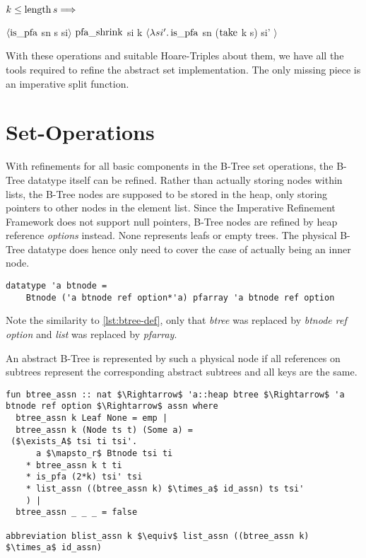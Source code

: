 \begin{lemma}
    $k \le \operatorname{length} s\Longrightarrow$ \\
    \begin{center}
    $\langle \operatorname{is\_pfa}$ sn s si$\rangle$
    $\operatorname{pfa\_shrink}$ si k
    $\langle\lambda si'. \operatorname{is\_pfa}$ sn ($\operatorname{take}$ k s) si' $\rangle$
    \end{center}
\end{lemma}

With these operations and suitable Hoare-Triples about them,
we have all the tools required to refine the abstract set implementation.
The only missing piece is an imperative split function.

\section{Set-Operations}

With refinements for all basic components in the B-Tree set operations,
the B-Tree datatype itself can be refined.
Rather than actually storing nodes within lists,
the B-Tree nodes are supposed to be stored in the heap,
only storing pointers to other nodes in the element list.
Since the Imperative Refinement Framework does not support null pointers,
B-Tree nodes are refined by heap reference \textit{options} instead.
None represents leafs or empty trees.
The physical B-Tree datatype does hence only need to cover the case
of actually being an inner node.

\begin{lstlisting}[mathescape=true, language=Isabelle]
datatype 'a btnode =
    Btnode ('a btnode ref option*'a) pfarray 'a btnode ref option
\end{lstlisting}

Note the similarity to \autoref{lst:btree-def},
only that \textit{btree} was replaced by \textit{btnode ref option}
and \textit{list} was replaced by \textit{pfarray}.

An abstract B-Tree is represented by such a physical node
if all references on subtrees represent the corresponding
abstract subtrees and all keys are the same.

\begin{lstlisting}[mathescape=true, language=Isabelle]
fun btree_assn :: nat $\Rightarrow$ 'a::heap btree $\Rightarrow$ 'a btnode ref option $\Rightarrow$ assn where
  btree_assn k Leaf None = emp |
  btree_assn k (Node ts t) (Some a) = 
 ($\exists_A$ tsi ti tsi'.
      a $\mapsto_r$ Btnode tsi ti
    * btree_assn k t ti
    * is_pfa (2*k) tsi' tsi
    * list_assn ((btree_assn k) $\times_a$ id_assn) ts tsi'
    ) |
  btree_assn _ _ _ = false

abbreviation blist_assn k $\equiv$ list_assn ((btree_assn k) $\times_a$ id_assn)

\end{lstlisting}

